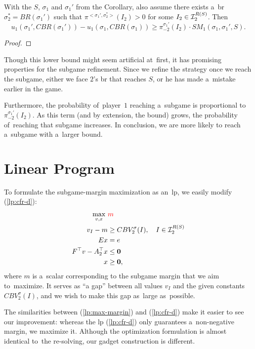 \begin{thm}
  \label{thm:improvement-propto-sm}
  With the $S$, $\sigma_1$ and $\sigma_1'$ from the Corollary, also assume there exists a~\acrlong{br}~$\sigma_2^* = BR(\sigma_1')$ such that $\pi^{<\sigma_1',\sigma_2^*>} (I_2) > 0$ for some $I_2 \in\mathcal{I}_2^{R(S)}$.
  Then 
  \[
    u_1(\sigma_1', CBR(\sigma_1')) - u_1(\sigma_1, CBR(\sigma_1)) \ge \pi_{-2}^{\sigma_1'} (I_2) \cdot SM_1(\sigma_1, \sigma_1', S).
  \]
\end{thm}
\begin{proof}
  \todo
\end{proof}
Though this lower bound might seem artificial at~first, it has promising properties for the subgame refinement.
Since we refine the strategy once we reach the subgame, either we face $2$'s \acrlong{br} that reaches $S$, or he has made a~mistake earlier in the game.

Furthermore, the probability of~player~$1$ reaching a~subgame is proportional to $\pi_{-2}^{\sigma_1'}(I_2)$.
As this term (and by extension, the bound) grows, the probability of~reaching that subgame increases.
In conclusion, we are more likely to reach a~subgame with a~larger bound.

\section{Linear Program}
To formulate the subgame-margin maximization as an~\acrshort{lp}, we easily modify (\ref{lp:cfr-d}):
\begin{equation}
  \label{lp:max-margin}
  \begin{split}
    \max_{v, x}\ &\textcolor{red}{m} \\
    v_I - m &\ge CBV_2^\sigma(I), \quad I \in \mathcal{I}_2^{R(S)}\\ 
    Ex &= e \\
    F^\top v - A_2^\top x &\le \boldsymbol{0} \\
    x &\ge \boldsymbol{0},
  \end{split}
\end{equation}
where $m$ is a~scalar corresponding to the subgame margin that we aim to~maximize.
It serves as ``a gap'' between all values $v_I$ and the given constants $CBV_2^\sigma(I)$, and we wish to make this gap as~large as~possible.

The similarities between (\ref{lp:max-margin}) and (\ref{lp:cfr-d}) make it easier to see our improvement:
whereas the \acrshort{lp} (\ref{lp:cfr-d}) only guarantees a~non-negative margin, we maximize it.
Although the optimization formulation is almost identical to~the re-solving, our gadget construction is different.

